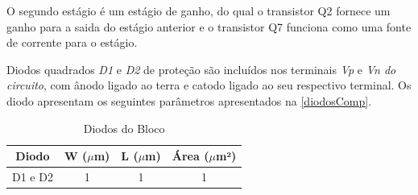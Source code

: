 O segundo est\'agio \'e um est\'agio de ganho, do qual o transistor Q2 fornece um ganho para a saida do est\'agio anterior e o transistor Q7 funciona como uma fonte de corrente para o est\'agio.

Diodos quadrados \emph{D1} e \emph{D2} de prote{\c c}\~ao s\~ao inclu\'idos nos terminais \emph{Vp} e \emph{Vn do circuito}, com \^anodo ligado ao terra e catodo ligado ao seu respectivo terminal. Os diodo apresentam os seguintes par\^ametros apresentados na \autoref{diodosComp}.

\begin{table}[htbp]
\caption{Diodos do Bloco \NomeBloco}
\label{diodosComp}
\centering
\begin{tabular}{cccc}
\toprule
Diodo & W ($\mu$m)  & L ($\mu$m)           & \'Area ($\mu$m²)\\
\midrule \midrule
D1 e D2 & 1 & 1 & 1 \\

\bottomrule
\end{tabular}
\end{table}
